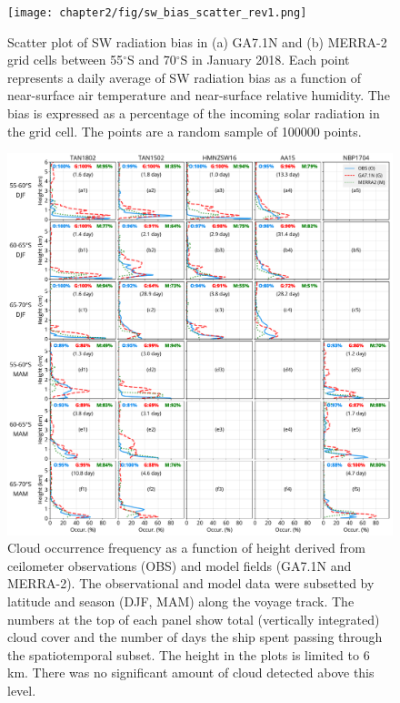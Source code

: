 \clearpage
\begin{figure}[t]
\centering
\texttt{[image: chapter2/fig/sw\_bias\_scatter\_rev1.png]}
\caption[Scatter plot of SW radiation bias in GA7.1N and MERRA-2]{
Scatter plot of SW radiation bias in (a) GA7.1N and (b) MERRA-2 grid cells
between 55$^\circ$S and 70$^\circ$S in January 2018. Each point represents a
daily average of SW radiation bias as a function of near-surface air temperature
and near-surface relative humidity. The bias is expressed as a percentage of the
incoming solar radiation in the grid cell. The points are a random sample of
100000 points.
}
\label{fig:sw-bias-scatter}
\end{figure}

\clearpage
\begin{figure}[t]
\centering
\includegraphics[width=\textwidth]{chapter2/fig/cloud_occurrence_panel_rev1.pdf}
\caption[Cloud occurrence frequency as a function of height derived from ceilometer
observations and model fields]{
Cloud occurrence frequency as a function of height derived from ceilometer
observations (OBS) and model fields (GA7.1N and MERRA-2). The observational and
model data were subsetted by latitude and season (DJF, MAM) along the voyage
track. The numbers at the top of each panel show total (vertically integrated)
cloud cover and the number of days the ship spent passing through the
spatiotemporal subset. The height in the plots is limited to 6 \unit{km}. There
was no significant amount of cloud detected above this level.
}
\label{fig:cloud-occurrence}
\end{figure}

